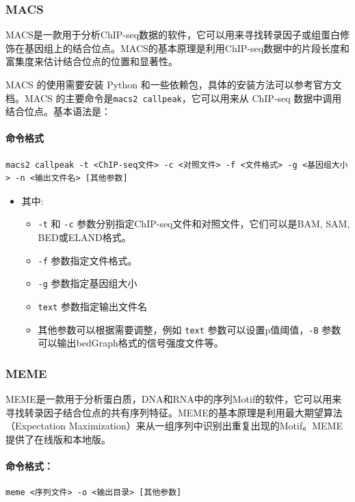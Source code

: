 \documentclass[UTF8]{ctexart}
\begin{document}
\subsubsection{MACS}

MACS是一款用于分析ChIP-seq数据的软件，它可以用来寻找转录因子或组蛋白修饰在基因组上的结合位点。MACS的基本原理是利用ChIP-seq数据中的片段长度和富集度来估计结合位点的位置和显著性。

MACS 的使用需要安装 Python 和一些依赖包，具体的安装方法可以参考官方文档。MACS 的主要命令是\verb|macs2 callpeak|，它可以用来从 ChIP-seq 数据中调用结合位点。基本语法是：

\paragraph*{命令格式}

\begin{lstlisting}
macs2 callpeak -t <ChIP-seq文件> -c <对照文件> -f <文件格式> -g <基因组大小> -n <输出文件名> [其他参数]
\end{lstlisting}

\begin{itemize}
	\item 其中:
	\begin{itemize}
		\item \verb|-t| 和 \verb|-c| 参数分别指定ChIP-seq文件和对照文件，它们可以是BAM, SAM, BED或ELAND格式。
		\item \verb|-f| 参数指定文件格式。
		\item \verb|-g| 参数指定基因组大小
		\item \verb|text| 参数指定输出文件名
		\item 其他参数可以根据需要调整，例如 \verb|text| 参数可以设置p值阈值，\verb|-B| 参数可以输出bedGraph格式的信号强度文件等。
	\end{itemize}
\end{itemize}

\subsubsection{MEME}

MEME是一款用于分析蛋白质，DNA和RNA中的序列Motif的软件，它可以用来寻找转录因子结合位点的共有序列特征。MEME的基本原理是利用最大期望算法（Expectation Maximization）来从一组序列中识别出重复出现的Motif。MEME提供了在线版和本地版。

\paragraph*{命令格式：}
\begin{lstlisting}
meme <序列文件> -o <输出目录> [其他参数]	
\end{lstlisting}
\end{document}
